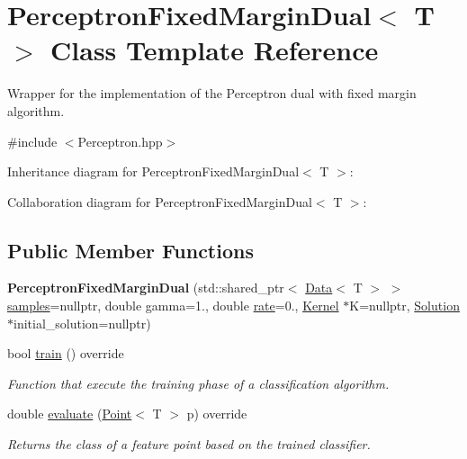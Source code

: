 \hypertarget{class_perceptron_fixed_margin_dual}{}\section{Perceptron\+Fixed\+Margin\+Dual$<$ T $>$ Class Template Reference}
\label{class_perceptron_fixed_margin_dual}


Wrapper for the implementation of the Perceptron dual with fixed margin algorithm.  




{\ttfamily \#include $<$Perceptron.\+hpp$>$}



Inheritance diagram for Perceptron\+Fixed\+Margin\+Dual$<$ T $>$\+:


Collaboration diagram for Perceptron\+Fixed\+Margin\+Dual$<$ T $>$\+:
\subsection*{Public Member Functions}
\begin{DoxyCompactItemize}
\item 
\mbox{\label{class_perceptron_fixed_margin_dual_ac1397a3a17a88769befdf64f83573895}} 
{\bfseries Perceptron\+Fixed\+Margin\+Dual} (std\+::shared\+\_\+ptr$<$ \mbox{\hyperlink{class_data}{Data}}$<$ T $>$ $>$ \mbox{\hyperlink{class_classifier_a0000b47a2e0784ada4c52d7046c4adb8}{samples}}=nullptr, double gamma=1., double \mbox{\hyperlink{class_classifier_a7b1c4ef87631bd9e46682e5bc4315111}{rate}}=0., \mbox{\hyperlink{class_kernel}{Kernel}} $\ast$K=nullptr, \mbox{\hyperlink{class_solution}{Solution}} $\ast$initial\+\_\+solution=nullptr)
\item 
bool \mbox{\hyperlink{class_perceptron_fixed_margin_dual_a58a5acdd6afaedff53fab23779f01486}{train}} () override
\begin{DoxyCompactList}\small\item\em Function that execute the training phase of a classification algorithm. \end{DoxyCompactList}\item 
double \mbox{\hyperlink{class_perceptron_fixed_margin_dual_acafabadf6d2552fde0bfb32f0344c6e3}{evaluate}} (\mbox{\hyperlink{class_point}{Point}}$<$ T $>$ p) override
\begin{DoxyCompactList}\small\item\em Returns the class of a feature point based on the trained classifier. \end{DoxyCompactList}\end{DoxyCompactItemize}
